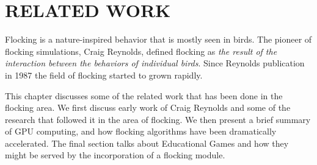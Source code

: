 \chapter{RELATED WORK}\label{chap2}


Flocking is a nature-inspired behavior that is mostly seen in birds. The pioneer of flocking simulations, Craig Reynolds, defined flocking as \textit{the result of the interaction between the behaviors of individual birds}\cite{craig1}. Since Reynolds publication in 1987 the field of flocking started to grown rapidly. %

This chapter discusses some of the related work that has been done in the flocking area. We first discuss early work of Craig Reynolds and some of the research that followed it in the area of flocking. We then present a brief summary of GPU computing, and how flocking algorithms have been dramatically accelerated. The final section talks about Educational Games and how they might be served by the incorporation of a flocking module. 





